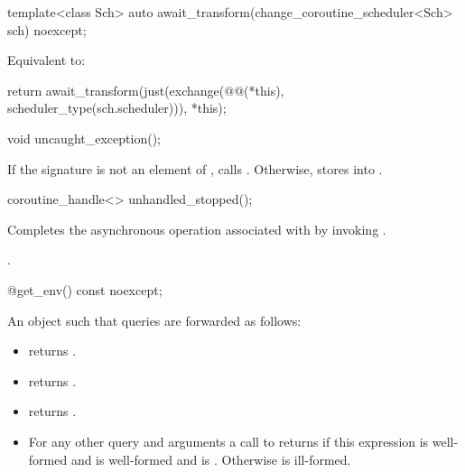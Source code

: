 %
\begin{itemdecl}
template<class Sch>
  auto await_transform(change_coroutine_scheduler<Sch> sch) noexcept;
\end{itemdecl}
\begin{itemdescr}
\pnum
\effects
Equivalent to:
\begin{codeblock}
return await_transform(just(exchange(@@(*this), scheduler_type(sch.scheduler))), *this);
\end{codeblock}
\end{itemdescr}

%
\begin{itemdecl}
void uncaught_exception();
\end{itemdecl}
\begin{itemdescr}
\pnum
\effects
If the signature  is not an element
of , calls .
Otherwise, stores  into .
\end{itemdescr}

%
\begin{itemdecl}
coroutine_handle<> unhandled_stopped();
\end{itemdecl}
\begin{itemdescr}
\pnum
\effects
Completes the asynchronous operation associated with 
by invoking .
\end{itemdescr}
\begin{itemdescr}
\pnum
\returns
{}.
\end{itemdescr}

%
\begin{itemdecl}
@\unspec@ get_env() const noexcept;
\end{itemdecl}
\begin{itemdescr}
\pnum
\returns
An object  such that queries are forwarded as follows:
\begin{itemize}
\item {} returns .
\item {} returns .
\item {} returns .
\item For any other query  and arguments  a
call to  returns
  if this expression
is well-formed and  is well-formed and is .
Otherwise  is ill-formed.
\end{itemize}
\end{itemdescr}

